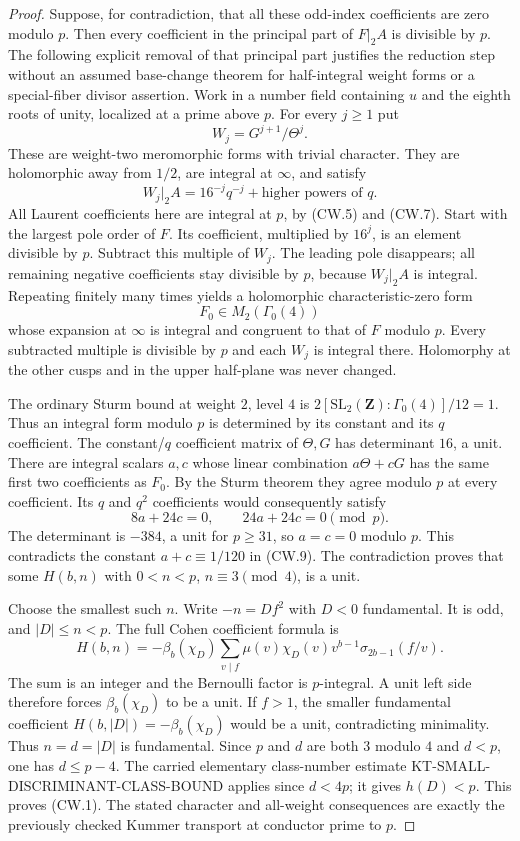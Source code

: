 \documentclass[11pt,a4paper]{article}
\theoremstyle{definition}
\begin{document}
\begin{proof}
Suppose, for contradiction, that all these odd-index coefficients
are zero modulo $p$.  Then every coefficient in the principal
part of $F|_2A$ is divisible by $p$.
The following explicit removal of that principal part justifies
the reduction step without an assumed base-change theorem for
half-integral weight forms or a special-fiber divisor assertion.
Work in a number field containing $u$ and the eighth roots of unity,
localized at a prime above $p$.  For every $j\geq1$ put
\[
                  W_j=G^{j+1}/\Theta^j.
 \tag{CW.12}
\]
These are weight-two meromorphic forms with trivial character.
They are holomorphic away from $1/2$, are integral at $\infty$,
and satisfy
\[
 W_j|_2A=16^{-j}q^{-j}+\text{higher powers of }q.
 \tag{CW.13}
\]
All Laurent coefficients here are integral at $p$, by
(CW.5) and (CW.7).  Start with the largest pole order of $F$.
Its coefficient, multiplied by $16^j$, is an element divisible
by $p$.  Subtract this multiple of $W_j$.  The leading pole
disappears; all remaining negative coefficients stay divisible
by $p$, because $W_j|_2A$ is integral.  Repeating finitely many
times yields a holomorphic characteristic-zero form
\[
                  F_0\in M_2(\Gamma_0(4))
 \tag{CW.14}
\]
whose expansion at $\infty$ is integral and congruent to that
of $F$ modulo $p$.  Every subtracted multiple is divisible
by $p$ and each $W_j$ is integral there.  Holomorphy at the
other cusps and in the upper half-plane was never changed.

The ordinary Sturm bound at weight $2$, level $4$ is
$2[\mathrm{SL}_2(\mathbf Z):\Gamma_0(4)]/12=1$.
Thus an integral form modulo $p$ is determined by its constant
and its $q$ coefficient.  The constant/$q$ coefficient matrix
of $\Theta,G$ has determinant $16$, a unit.  There are integral
scalars $a,c$ whose linear combination $a\Theta+cG$ has the
same first two coefficients as $F_0$.  By the Sturm theorem
they agree modulo $p$ at every coefficient.  Its $q$ and
$q^2$ coefficients would consequently satisfy
\[
 8a+24c=0,\qquad24a+24c=0\pmod p.
 \tag{CW.15}
\]
The determinant is $-384$, a unit for $p\geq31$, so
$a=c=0$ modulo $p$.  This contradicts the constant
$a+c\equiv1/120$ in (CW.9).  The contradiction proves that
some $H(b,n)$ with $0<n<p$, $n\equiv3\pmod4$, is a unit.

Choose the smallest such $n$.  Write $-n=D f^2$ with
$D<0$ fundamental.  It is odd, and $|D|\leq n<p$.
The full Cohen coefficient formula is
\[
 H(b,n)=-\beta_b(\chi_D)
       \sum_{v\mid f}\mu(v)\chi_D(v)v^{b-1}
                                  \sigma_{2b-1}(f/v).
 \tag{CW.16}
\]
The sum is an integer and the Bernoulli factor is $p$-integral.
A unit left side therefore forces $\beta_b(\chi_D)$ to be
a unit.  If $f>1$, the smaller fundamental coefficient
$H(b,|D|)=-\beta_b(\chi_D)$ would be a unit, contradicting
minimality.  Thus $n=d=|D|$ is fundamental.
Since $p$ and $d$ are both $3$ modulo $4$ and $d<p$,
one has $d\leq p-4$.
The carried elementary class-number estimate
KT-SMALL-DISCRIMINANT-CLASS-BOUND applies since $d<4p$;
it gives $h(D)<p$.  This proves (CW.1).
The stated character and all-weight consequences are exactly
the previously checked Kummer transport at conductor prime to $p$.
\end{proof}
\end{document}
